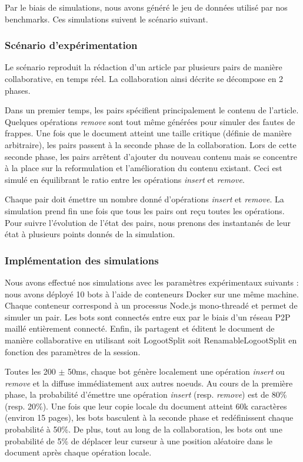 \documentclass[12pt]{thesul}
\begin{document}
Par le biais de simulations, nous avons généré le jeu de données utilisé par nos benchmarks.
Ces simulations suivent le scénario suivant.

\subsubsection{Scénario d'expérimentation}

Le scénario reproduit la rédaction d'un article par plusieurs pairs de manière collaborative, en temps réel.
La collaboration ainsi décrite se décompose en 2 phases.

Dans un premier temps, les pairs spécifient principalement le contenu de l'article.
Quelques opérations \emph{remove} sont tout même générées pour simuler des fautes de frappes.
Une fois que le document atteint une taille critique (définie de manière arbitraire), les pairs passent à la seconde phase de la collaboration.
Lors de cette seconde phase, les pairs arrêtent d'ajouter du nouveau contenu mais se concentre à la place sur la reformulation et l'amélioration du contenu existant.
Ceci est simulé en équilibrant le ratio entre les opérations \emph{insert} et \emph{remove}.

Chaque pair doit émettre un nombre donné d'opérations \emph{insert} et \emph{remove}.
La simulation prend fin une fois que tous les pairs ont reçu toutes les opérations.
Pour suivre l'évolution de l'état des pairs, nous prenons des instantanés de leur état à plusieurs points donnés de la simulation.

\subsubsection{Implémentation des simulations}

Nous avons effectué nos simulations avec les paramètres expérimentaux suivants : nous avons déployé 10 bots à l'aide de conteneurs Docker sur une même machine.
Chaque conteneur correspond à un processus Node.js mono-threadé et permet de simuler un pair.
Les bots sont connectés entre eux par le biais d'un réseau P2P maillé entièrement connecté.
Enfin, ils partagent et éditent le document de manière collaborative en utilisant soit LogootSplit soit RenamableLogootSplit en fonction des paramètres de la session.

Toutes les 200 $\pm$ 50ms, chaque bot génère localement une opération \emph{insert} ou \emph{remove} et la diffuse immédiatement aux autres noeuds.
Au cours de la première phase, la probabilité d'émettre une opération \emph{insert} (resp. \emph{remove}) est de 80\% (resp. 20\%).
Une fois que leur copie locale du document atteint 60k caractères (environ 15 pages), les bots basculent à la seconde phase et redéfinissent chaque probabilité à 50\%.
De plus, tout au long de la collaboration, les bots ont une probabilité de 5\% de déplacer leur curseur à une position aléatoire dans le document après chaque opération locale.
\end{document}
